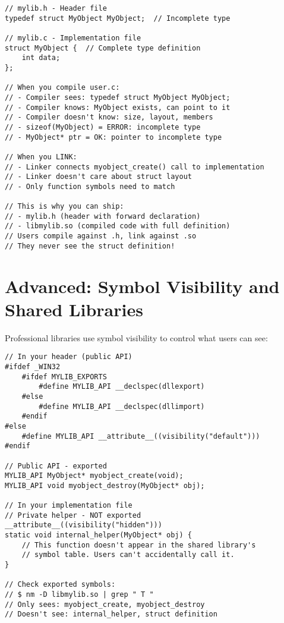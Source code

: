 \begin{lstlisting}
// mylib.h - Header file
typedef struct MyObject MyObject;  // Incomplete type

// mylib.c - Implementation file
struct MyObject {  // Complete type definition
    int data;
};

// When you compile user.c:
// - Compiler sees: typedef struct MyObject MyObject;
// - Compiler knows: MyObject exists, can point to it
// - Compiler doesn't know: size, layout, members
// - sizeof(MyObject) = ERROR: incomplete type
// - MyObject* ptr = OK: pointer to incomplete type

// When you LINK:
// - Linker connects myobject_create() call to implementation
// - Linker doesn't care about struct layout
// - Only function symbols need to match

// This is why you can ship:
// - mylib.h (header with forward declaration)
// - libmylib.so (compiled code with full definition)
// Users compile against .h, link against .so
// They never see the struct definition!
\end{lstlisting}

\section{Advanced: Symbol Visibility and Shared Libraries}

Professional libraries use symbol visibility to control what users can see:

\begin{lstlisting}
// In your header (public API)
#ifdef _WIN32
    #ifdef MYLIB_EXPORTS
        #define MYLIB_API __declspec(dllexport)
    #else
        #define MYLIB_API __declspec(dllimport)
    #endif
#else
    #define MYLIB_API __attribute__((visibility("default")))
#endif

// Public API - exported
MYLIB_API MyObject* myobject_create(void);
MYLIB_API void myobject_destroy(MyObject* obj);

// In your implementation file
// Private helper - NOT exported
__attribute__((visibility("hidden")))
static void internal_helper(MyObject* obj) {
    // This function doesn't appear in the shared library's
    // symbol table. Users can't accidentally call it.
}

// Check exported symbols:
// $ nm -D libmylib.so | grep " T "
// Only sees: myobject_create, myobject_destroy
// Doesn't see: internal_helper, struct definition
\end{lstlisting}

